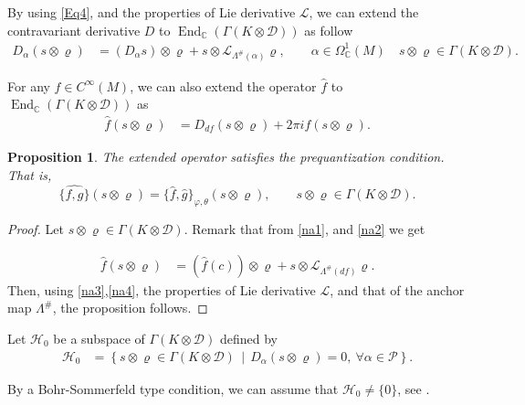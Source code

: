 \documentclass[a4paper,10pt]{article}
\numberwithin{equation}{section}
\theoremstyle{plain}
\newtheorem{proposition}[theorem]{Proposition}
\begin{document}
	By using \eqref{Eq4}, and  the properties of  Lie derivative $\mathcal{L}$, we can extend the contravariant derivative  $D$  to  $\operatorname{End}_{\mathbb{C}}(\Gamma(K \otimes \mathcal{D}))$ as follow
	\begin{align}\label{na1}
	D_\alpha(s \otimes \varrho)& = (D_\alpha s) \otimes \varrho + s \otimes \mathcal{L}_{\Lambda^\#(\alpha)}\varrho, \quad\quad \alpha \in \Omega_{\mathbb{C}}^1(M)\quad s \otimes \varrho \in \Gamma(K \otimes \mathcal{D}).
	\end{align}
	
	For any  $f\in C^\infty(M)$, we can also extend the  operator  $\hat{f}$  to $\operatorname{End}_{\mathbb{C}}(\Gamma(K \otimes \mathcal{D}))$ as
	\begin{align}\label{na2}
	\hat{f}(s \otimes \varrho)& = D_{df}(s \otimes \varrho) + 2\pi i f (s \otimes \varrho).
	\end{align}
	
	
	\begin{proposition}
		The extended operator satisfies the prequantization condition. That is,
		\[
		\widehat{\{f,g\}}(s \otimes \varrho) = \{\hat{f},\hat{g}\}_{\varphi,\theta}(s \otimes \varrho), \quad\quad  s \otimes \varrho \in \Gamma(K \otimes \mathcal{D}).
		\]
	\end{proposition}
	
	\begin{proof}
		Let $s \otimes \varrho \in \Gamma(K \otimes \mathcal{D})$. Remark that from \eqref{na1}, and \eqref{na2}  we get
		
		\begin{align}\label{na3}
		\hat{f}(s \otimes \varrho ) &= (\hat{f}(c))\otimes\varrho+s\otimes\mathcal{L}_{\Lambda^{\#}(df)}\varrho.
		\end{align}
		Then, using \eqref{na3},\eqref{na4}, the properties of Lie derivative $\mathcal{L}$, and that of the anchor map $\Lambda^{\#}$, the proposition follows.
	\end{proof}
	
	Let $\mathcal{H}_0 $ be a subspace of $\Gamma(K \otimes \mathcal{D})$  defined by
	\begin{align}\label{nb2}
	\mathcal{H}_0& = \left\{ s \otimes \varrho \in \Gamma(K \otimes \mathcal{D}) \,\middle|\, D_\alpha(s \otimes \varrho) = 0,\ \forall \alpha \in \mathcal{P} \right\}.
	\end{align}
	
	By a Bohr-Sommerfeld type condition, we can assume  that $\mathcal{H}_0 \neq \{0\}$, see \cite[Page 71-72]{R26}.
	
\end{document}
